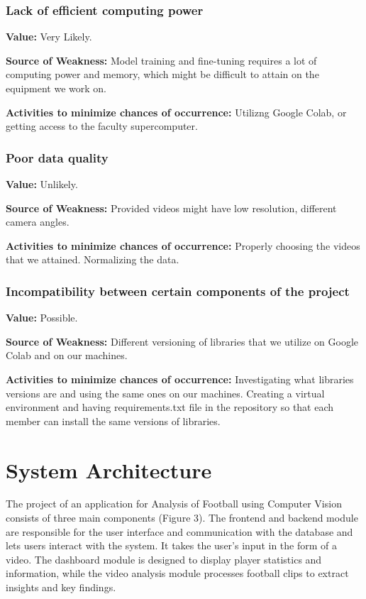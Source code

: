 \documentclass{article}
\begin{document}
\subsubsection{Lack of efficient computing power}
\noindent \textbf{Value: } Very Likely.

\vspace{0.5em}
\noindent \textbf{Source of Weakness:} Model training and fine-tuning requires a lot of computing power and memory, which might be difficult to attain on the equipment we work on.

\vspace{0.5em}
\noindent \textbf{Activities to minimize chances of occurrence:} Utilizng Google Colab, or getting access to the faculty supercomputer.

\subsubsection{Poor data quality}
\noindent \textbf{Value: } Unlikely.

\vspace{0.5em}
\noindent \textbf{Source of Weakness:} Provided videos might have low resolution, different camera angles.

\vspace{0.5em}
\noindent \textbf{Activities to minimize chances of occurrence:} Properly choosing the videos that we attained. Normalizing the data.

\subsubsection{Incompatibility between certain components of the project}
\noindent \textbf{Value: } Possible.

\vspace{0.5em}
\noindent \textbf{Source of Weakness:} Different versioning of libraries that we utilize on Google Colab and on our machines.

\vspace{0.5em}
\noindent \textbf{Activities to minimize chances of occurrence:} Investigating what libraries versions are and using the same ones on our machines. Creating a virtual environment and having requirements.txt file in the repository so that each member can install the same versions of libraries.

\pagebreak
\section{System Architecture}
The project of an application for Analysis of Football using Computer Vision consists of three main components (Figure 3). The frontend and backend module are responsible for the user interface and communication with the database and lets users interact with the system. It takes the user's input in the form of a video. The dashboard module is designed to display player statistics and information, while the video analysis module processes football clips to extract insights and key findings.\vspace{0.5em}
\end{document}
